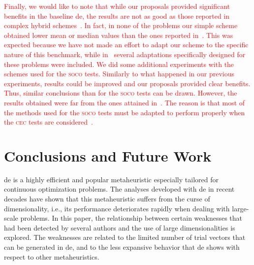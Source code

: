 \documentclass[review,3p]{elsarticle}
\newcommand{\DE}{{\sc de}}
\begin{document}
%
\textcolor{red}{
Finally, we would like to note that while our proposals provided significant benefits in the baseline \DE{},
the results are not as good as those reported in complex hybrid schemes~\cite{Brest:12,LaTorre:12}. 
%
In fact, in none of the problems our simple scheme obtained lower mean or median values than the ones reported in~\cite{Brest:12}.
%
This was expected because we have not made an effort to adapt our scheme to the specific nature of this benchmark,
while in~\cite{Brest:12} several adaptations specifically designed for these problems were included.
%
%
We did some additional experiments with the schemes used for the \textsc{soco} tests.
%
Similarly to what happened in our previous experiments, results could be improved and our proposals provided clear benefits.
%
Thus, similar conclusions than for the \textsc{soco} tests can be drawn.
%
However, the results obtained were far from the ones attained in~\cite{Brest:12}.
%
The reason is that most of the methods used for the \textsc{soco} tests must be adapted to perform properly when the \textsc{cec}
tests are considered~\cite{LaTorre:14}.
}
%

\section{Conclusions and Future Work}
\label{sec:conc}

\DE{} is a highly efficient and popular metaheuristic especially tailored for continuous optimization problems.
%
The analyses developed with \DE{} in recent decades have shown that this metaheuristic suffers from
the curse of dimensionality, i.e., its performance deteriorates rapidly when dealing with large-scale problems.
%
In this paper, the relationship between certain weaknesses that had been detected by several authors and the use
of large dimensionalities is explored.
%
The weaknesses are related to the limited number of trial vectors that can be generated in \DE{}, and to the
less expansive behavior that \DE{} shows with respect to other metaheuristics.
\end{document}
